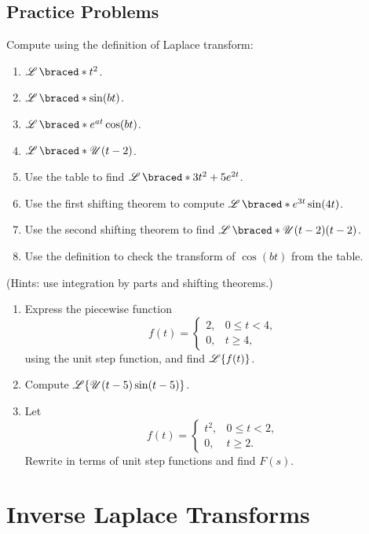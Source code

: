   \subsection*{Practice Problems}
  \begin{question}
    Compute using the definition of Laplace transform:
    \begin{enumerate}
      \item $\laplace\braced*{t^2}$.
      \item $\laplace\braced*{\sin(bt)}$.
      \item $\laplace\braced*{e^{at}\cos(bt)}$.
      \item $\laplace\braced*{\hstep(t-2)}$.
      \item Use the table to find $\laplace\braced*{3t^2 + 5e^{2t}}$.
      \item Use the first shifting theorem to compute $\laplace\braced*{e^{3t}\sin(4t)}$.
      \item Use the second shifting theorem to find $\laplace\braced*{\hstep(t-2)(t-2)}$.
      \item Use the definition to check the transform of $\cos(bt)$ from the table.
    \end{enumerate}
    (Hints: use integration by parts and shifting theorems.)

    \begin{enumerate}
      \item Express the piecewise function
      \[
      f(t) = 
      \begin{cases}
      2, & 0 \leq t < 4, \\
      0, & t \geq 4,
      \end{cases}
      \]
      using the unit step function, and find $\operatorname{\mathscr{L}}\{f(t)\}$.

      \item Compute $\operatorname{\mathscr{L}}\{\operatorname{\mathscr{U}}(t-5)\sin(t-5)\}$.

      \item Let
      \[
      f(t) = 
      \begin{cases}
      t^2, & 0 \leq t < 2, \\
      0, & t \geq 2.
      \end{cases}
      \]
      Rewrite in terms of unit step functions and find $F(s)$.
    \end{enumerate}
  \end{question}



  \section{Inverse Laplace Transforms}


